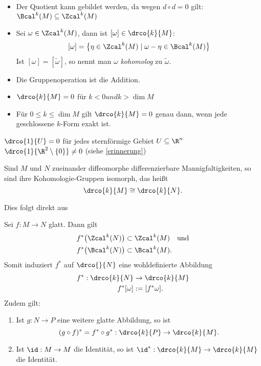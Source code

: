 \begin{rem*}
	\begin{itemize}
		\item Der Quotient kann gebildet werden, da wegen $d \circ d = 0$ gilt: $\Bcal^k(M) \subseteq \Zcal^k(M)$
		\item Sei $\omega \in \Zcal^k(M)$, dann ist $[\omega] \in \drco{k}{M}$:
			\[ [\omega] = \big\{ \eta \in \Zcal^k(M) \mid \omega - \eta \in \Bcal^k(M) \big\} \]
			Ist $[\omega] = [\tilde{\omega}]$, so nennt man $\omega$ \emph{kohomolog} zu $\tilde{\omega}$.
		\item Die Gruppenoperation ist die Addition.
		\item $ \drco{k}{M} = 0 $ für $k<0 und k > \dim M$
		\item Für $ 0 \leq k \leq \dim M $ gilt $ \drco{k}{M} = 0 $ genau dann, wenn jede geschlossene $k$-Form exakt ist.
	\end{itemize}
\end{rem*}

\begin{exmp*}
	$ \drco{1}{U} = 0 $ für jedes sternförmige Gebiet $U \subseteq \R^n$\\
	$ \drco{1}{\R^2 \setminus \{0\}} \neq 0 $ (siehe \ref{erinnerung})
\end{exmp*}

\begin{lem}\label{7.14}
	Sind $M$ und $N$ zueinander diffeomorphe differenzierbare Mannigfaltigkeiten, so sind ihre Kohomologie-Gruppen isomorph, das heißt
	\[ \drco{k}{M} \cong \drco{k}{N}. \]
\end{lem}

\noindent Dies folgt direkt aus

\begin{lem}
	Sei $ f: M \to N $ glatt. Dann gilt
	\begin{align*}
		f^*\big(\Zcal^k(N)\big) &\subset \Zcal^k(M) \quad \text{und}\\
		f^*\big(\Bcal^k(N)\big) &\subset \Bcal^k(M).
	\end{align*}
	Somit induziert $f^*$ auf $\drco{}{N}$ eine wohldefinierte Abbildung
	\begin{align*}
		f^*: \drco{k}{N} &\to \drco{k}{M}\\
		f^*[\omega] &:= [f^*\omega].
	\end{align*}
	Zudem gilt:
	\begin{enumerate}[label={\roman*})]
		\item Ist $g: N \to P$ eine weitere glatte Abbildung, so ist
			\[ (g \circ f)^* = f^* \circ g^*: \drco{k}{P} \to \drco{k}{M}. \]
		\item Ist $\id: M \to M$ die Identität, so ist $ \id^*: \drco{k}{M} \to \drco{k}{M} $ die Identität.
	\end{enumerate}
\end{lem}

